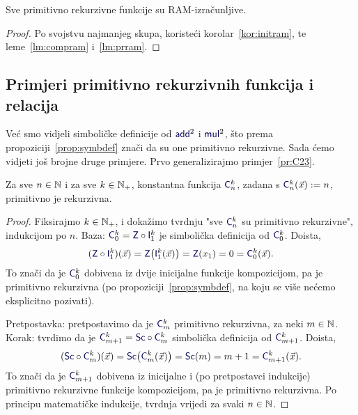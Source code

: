 \begin{propozicija}\label{prop:prnram}
Sve primitivno rekurzivne funkcije su RAM-izračunljive.
\end{propozicija}
\begin{proof}
Po svojstvu najmanjeg skupa, koristeći korolar~\ref{kor:initram}, te leme~\ref{lm:compram} i~\ref{lm:prram}.
\end{proof}

\subsection{Primjeri primitivno rekurzivnih funkcija i relacija}

Već smo vidjeli simboličke definicije od $\f{add}^2$ i $\f{mul}^2$, što prema propoziciji~\ref{prop:symbdef} znači da su one primitivno rekurzivne. Sada ćemo vidjeti još brojne druge primjere. Prvo generalizirajmo primjer~\ref{pr:C23}.

\begin{propozicija}\label{prop:konst}
Za sve $n\in{\mathbb N}$ i za sve $k\in{\mathbb N}_+$, konstantna funkcija $\f C_n^k$, zadana s $\f C_n^k(\vec x):=n$, primitivno je rekurzivna.
\end{propozicija}
\begin{proof}
Fiksirajmo $k\in{\mathbb N}_+$, i dokažimo tvrdnju "sve $\f C_n^k$ su primitivno rekurzivne", indukcijom po $n$. Baza: $\f C_0^k=\f Z\circ\f I_1^k$ je simbolička definicija od $\f C_0^k$. Doista,
\begin{equation}
    (\f Z\circ\f I_1^k)(\vec x)=\f Z\bigl(\f I_1^k(\vec x)\bigr)=\f Z(x_1)=0=\f C_0^k(\vec x)\text.
\end{equation}
To znači da je $\f C_0^k$ dobivena iz dvije inicijalne funkcije kompozicijom, pa je primitivno rekurzivna (po propoziciji~\ref{prop:symbdef}, na koju se više nećemo eksplicitno pozivati).

Pretpostavka: pretpostavimo da je $\f C_m^k$ primitivno rekurzivna, za neki $m\in{\mathbb N}$. 
Korak: tvrdimo da je $\f C_{m+1}^k=\f{Sc}\circ\f C_m^k$ simbolička definicija od $\f C_{m+1}^k$. Doista,
\begin{equation}
    (\f{Sc}\circ\f C_m^k)(\vec x)=\f{Sc}\bigl(\f C_m^k(\vec x)\bigr)=\f{Sc}(m)=m+1=\f C_{m+1}^k(\vec x)\text.
\end{equation}
To znači da je $\f C_{m+1}^k$ dobivena iz inicijalne i (po pretpostavci indukcije) primitivno rekurzivne funkcije kompozicijom, pa je primitivno rekurzivna. Po principu matematičke indukcije, tvrdnja vrijedi za svaki $n\in{\mathbb N}$.
\end{proof}

